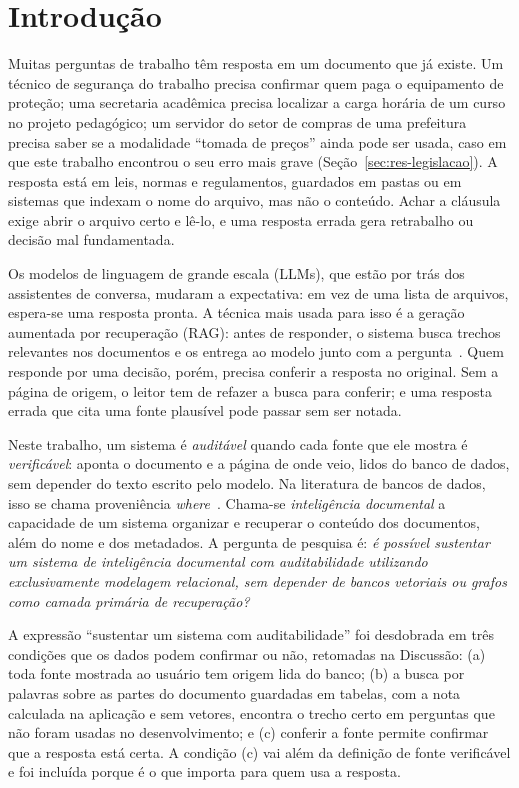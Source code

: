\documentclass[12pt]{article}
\begin{document}
\section{Introdução}
\label{sec:introducao}

Muitas perguntas de trabalho têm resposta em um documento que já existe. Um técnico de segurança do trabalho precisa confirmar quem paga o equipamento de proteção; uma secretaria acadêmica precisa localizar a carga horária de um curso no projeto pedagógico; um servidor do setor de compras de uma prefeitura precisa saber se a modalidade ``tomada de preços'' ainda pode ser usada, caso em que este trabalho encontrou o seu erro mais grave (Seção~\ref{sec:res-legislacao}). A resposta está em leis, normas e regulamentos, guardados em pastas ou em sistemas que indexam o nome do arquivo, mas não o conteúdo. Achar a cláusula exige abrir o arquivo certo e lê-lo, e uma resposta errada gera retrabalho ou decisão mal fundamentada.

Os modelos de linguagem de grande escala (LLMs), que estão por trás dos assistentes de conversa, mudaram a expectativa: em vez de uma lista de arquivos, espera-se uma resposta pronta. A técnica mais usada para isso é a geração aumentada por recuperação (RAG): antes de responder, o sistema busca trechos relevantes nos documentos e os entrega ao modelo junto com a pergunta~\cite{lewis2020rag}. Quem responde por uma decisão, porém, precisa conferir a resposta no original. Sem a página de origem, o leitor tem de refazer a busca para conferir; e uma resposta errada que cita uma fonte plausível pode passar sem ser notada.

Neste trabalho, um sistema é \emph{auditável} quando cada fonte que ele mostra é \emph{verificável}: aponta o documento e a página de onde veio, lidos do banco de dados, sem depender do texto escrito pelo modelo. Na literatura de bancos de dados, isso se chama proveniência \emph{where}~\cite{buneman2001provenance}. Chama-se \emph{inteligência documental} a capacidade de um sistema organizar e recuperar o conteúdo dos documentos, além do nome e dos metadados. A pergunta de pesquisa é: \emph{é possível sustentar um sistema de inteligência documental com auditabilidade utilizando exclusivamente modelagem relacional, sem depender de bancos vetoriais ou grafos como camada primária de recuperação?}

A expressão ``sustentar um sistema com auditabilidade'' foi desdobrada em três condições que os dados podem confirmar ou não, retomadas na Discussão: (a) toda fonte mostrada ao usuário tem origem lida do banco; (b) a busca por palavras sobre as partes do documento guardadas em tabelas, com a nota calculada na aplicação e sem vetores, encontra o trecho certo em perguntas que não foram usadas no desenvolvimento; e (c) conferir a fonte permite confirmar que a resposta está certa. A condição (c) vai além da definição de fonte verificável e foi incluída porque é o que importa para quem usa a resposta.
\end{document}

